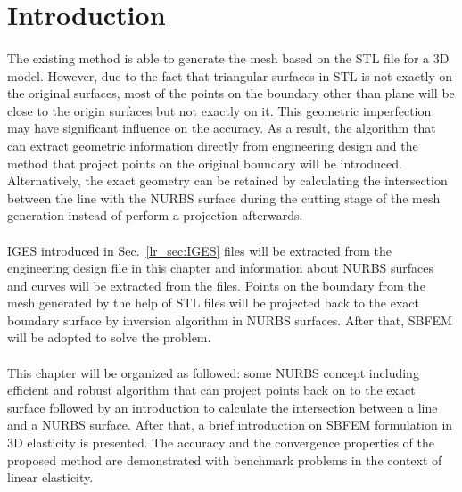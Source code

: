 \section{Introduction}
\paragraph{}
The existing method is able to generate the mesh based on the STL file for a 3D model.
However, due to the fact that triangular surfaces in STL is not exactly on the original surfaces, most of the points on the boundary other than plane will be close to the origin surfaces but not exactly on it.
This geometric imperfection may have significant influence on the accuracy.
As a result, the algorithm that can extract geometric information directly from engineering design and the method that project points on the original boundary will be introduced.
Alternatively, the exact geometry can be retained by calculating the intersection between the line with the NURBS surface during the cutting stage of the mesh generation instead of perform a projection afterwards.

\paragraph{}
IGES introduced in Sec.~\ref{lr_sec:IGES} files will be extracted from the engineering design file in this chapter and information about NURBS surfaces and curves will be extracted from the files.
Points on the boundary from the mesh generated by the help of STL files will be projected back to the exact boundary surface by inversion algorithm in NURBS surfaces.
After that, SBFEM will be adopted to solve the problem.

\paragraph{}
This chapter will be organized as followed: some NURBS concept including efficient and robust algorithm that can project points back on to the exact surface followed by an introduction to calculate the intersection between a line and a NURBS surface.
After that, a brief introduction on SBFEM formulation in 3D elasticity is presented.
The accuracy and the convergence properties of the proposed method are demonstrated with benchmark problems in the context of linear elasticity.